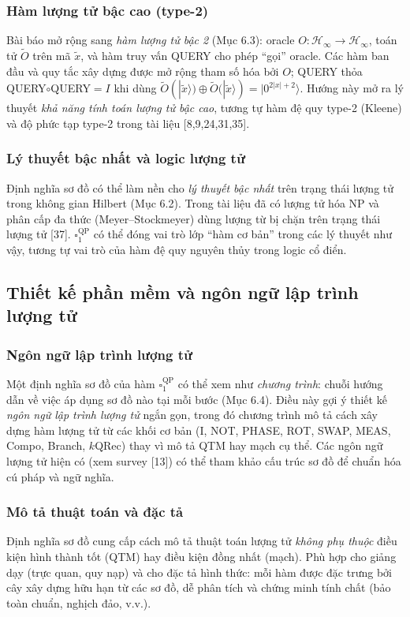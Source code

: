 \documentclass[10pt]{article}
\begin{document}
\subsubsection*{Hàm lượng tử bậc cao (type-2)}
Bài báo mở rộng sang \emph{hàm lượng tử bậc 2} (Mục 6.3): oracle $O:\mathcal{H}_\infty\to\mathcal{H}_\infty$, toán tử $\tilde{O}$ trên mã $\tilde{x}$, và hàm truy vấn QUERY cho phép ``gọi'' oracle. Các hàm ban đầu và quy tắc xây dựng được mở rộng tham số hóa bởi $O$; QUERY thỏa QUERY$\circ$QUERY$=I$ khi dùng $\tilde{O}(|\tilde{x}\rangle)\oplus\tilde{O}(|\tilde{x}\rangle)=|0^{2|x|+2}\rangle$. Hướng này mở ra lý thuyết \emph{khả năng tính toán lượng tử bậc cao}, tương tự hàm đệ quy type-2 (Kleene) và độ phức tạp type-2 trong tài liệu [8,9,24,31,35].

\subsubsection*{Lý thuyết bậc nhất và logic lượng tử}
Định nghĩa sơ đồ có thể làm nền cho \emph{lý thuyết bậc nhất} trên trạng thái lượng tử trong không gian Hilbert (Mục 6.2). Trong tài liệu đã có lượng tử hóa NP và phân cấp đa thức (Meyer–Stockmeyer) dùng lượng từ bị chặn trên trạng thái lượng tử [37]. $\square_1^{\mathrm{QP}}$ có thể đóng vai trò lớp ``hàm cơ bản'' trong các lý thuyết như vậy, tương tự vai trò của hàm đệ quy nguyên thủy trong logic cổ điển.

\subsection*{Thiết kế phần mềm và ngôn ngữ lập trình lượng tử}

\subsubsection*{Ngôn ngữ lập trình lượng tử}
Một định nghĩa sơ đồ của hàm $\square_1^{\mathrm{QP}}$ có thể xem như \emph{chương trình}: chuỗi hướng dẫn về việc áp dụng sơ đồ nào tại mỗi bước (Mục 6.4). Điều này gợi ý thiết kế \emph{ngôn ngữ lập trình lượng tử} ngắn gọn, trong đó chương trình mô tả cách xây dựng hàm lượng tử từ các khối cơ bản (I, NOT, PHASE, ROT, SWAP, MEAS, Compo, Branch, $k$QRec) thay vì mô tả QTM hay mạch cụ thể. Các ngôn ngữ lượng tử hiện có (xem survey [13]) có thể tham khảo cấu trúc sơ đồ để chuẩn hóa cú pháp và ngữ nghĩa.

\subsubsection*{Mô tả thuật toán và đặc tả}
Định nghĩa sơ đồ cung cấp cách mô tả thuật toán lượng tử \emph{không phụ thuộc} điều kiện hình thành tốt (QTM) hay điều kiện đồng nhất (mạch). Phù hợp cho giảng dạy (trực quan, quy nạp) và cho đặc tả hình thức: mỗi hàm được đặc trưng bởi cây xây dựng hữu hạn từ các sơ đồ, dễ phân tích và chứng minh tính chất (bảo toàn chuẩn, nghịch đảo, v.v.).
\end{document}
